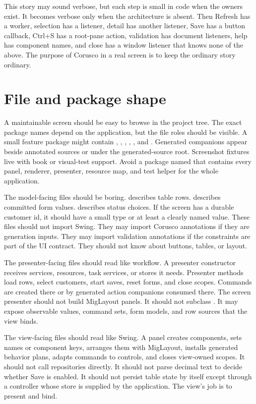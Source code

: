 This story may sound verbose, but each step is small in code when the owners
exist. It becomes verbose only when the architecture is absent. Then Refresh
has a worker, selection has a listener, detail has another listener, Save has
a button callback, Ctrl+S has a root-pane action, validation has document
listeners, help has component names, and close has a window listener that
knows none of the above. The purpose of Corusco in a real screen is to keep
the ordinary story ordinary.

\section{File and package shape}

A maintainable screen should be easy to browse in the project tree. The exact
package names depend on the application, but the file roles should be visible.
A small feature package might contain , ,
, ,
, and . Generated
companions appear beside annotated sources or under the generated-source root.
Screenshot fixtures live with book or visual-test support. Avoid a package
named  that contains every panel, renderer, presenter, resource map,
and test helper for the whole application.

The model-facing files should be boring.  describes table
rows.  describes committed form values.
 describes status choices. If the screen has a durable
customer id, it should have a small type or at least a clearly named value.
These files should not import Swing. They may import Corusco annotations if
they are generation inputs. They may import validation annotations if the
constraints are part of the UI contract. They should not know about buttons,
tables, or layout.

The presenter-facing files should read like workflow. A presenter constructor
receives services, resources, task services, or stores it needs. Presenter
methods load rows, select customers, start saves, reset forms, and close
scopes. Commands are created there or by generated action companions consumed
there. The screen presenter should not build MigLayout panels. It should not subclass
. It may expose observable values, command sets, form models, and
row sources that the view binds.

The view-facing files should read like Swing. A panel creates components,
sets names or component keys, arranges them with MigLayout, installs generated
behavior plans, adapts commands to controls, and closes view-owned scopes. It
should not call repositories directly. It should not parse decimal text to
decide whether Save is enabled. It should not persist table state by itself
except through a controller whose store is supplied by the application. The
view's job is to present and bind.

